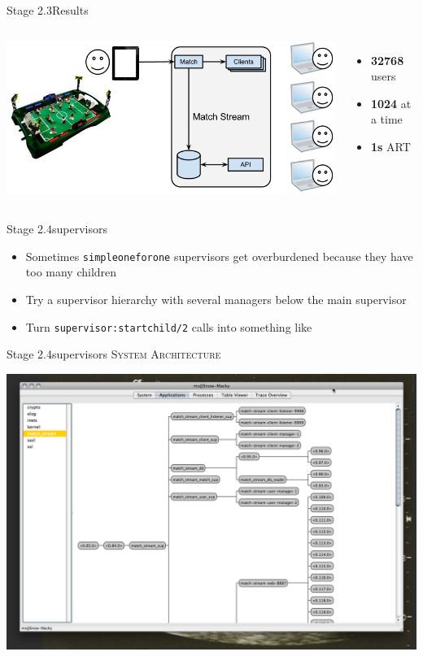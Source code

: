 \documentclass[utf8]{beamer}
\begin{document}
\begin{frame}{Stage 2.3}{Results}
	\begin{columns}
			\includegraphics[top=-1,width=\textwidth]{img/results-3-3.png}
			\begin{itemize}
				\item \textbf{\Large 32768} users
				\item \textbf{\Large 1024} at a time
				\item \textbf{\Large 1s} ART
			\end{itemize}
	\end{columns}
\end{frame}
\begin{frame}{Stage 2.4}{supervisors}
	\begin{itemize}
		\item Sometimes \texttt{simple\textunderscore one\textunderscore for\textunderscore one} supervisors get \alert{overburdened} because they have too many children
		\item Try a supervisor hierarchy with several managers below the main supervisor
		\item Turn \texttt{supervisor:start\textunderscore child/2} calls into something like
		\startchild
	\end{itemize}
\end{frame}
\begin{frame}{Stage 2.4}{supervisors}
	\textsc{System Architecture}
	\begin{center}
		\includegraphics[height=.75\textheight]{img/running-late.png}
	\end{center}
\end{frame}
\end{document}
